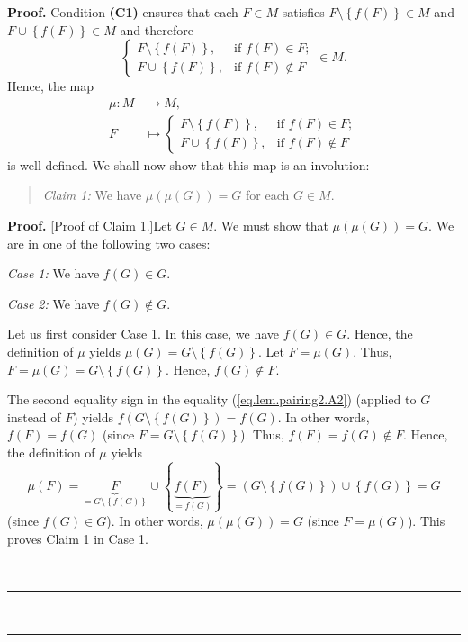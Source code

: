 \documentclass[numbers=enddot,12pt,final,onecolumn,notitlepage]{scrartcl}%
\theoremstyle{definition}
\newenvironment{statement}{\begin{quote}}{\end{quote}}
\newenvironment{proof}[1][Proof]{\noindent\textbf{#1.} }{\ \rule{0.5em}{0.5em}}
\newenvironment{vershort}{}{}
\begin{document}
\begin{proof}
Condition \textbf{(C1)} ensures that each $F\in M$ satisfies $F\setminus
\left\{  f\left(  F\right)  \right\}  \in M$ and $F\cup\left\{  f\left(
F\right)  \right\}  \in M$ and therefore
\[%
\begin{cases}
F\setminus\left\{  f\left(  F\right)  \right\}  , & \text{if }f\left(
F\right)  \in F;\\
F\cup\left\{  f\left(  F\right)  \right\}  , & \text{if }f\left(  F\right)
\notin F
\end{cases}
\in M.
\]
Hence, the map
\begin{align*}
\mu:M  &  \rightarrow M,\\
F  &  \mapsto%
\begin{cases}
F\setminus\left\{  f\left(  F\right)  \right\}  , & \text{if }f\left(
F\right)  \in F;\\
F\cup\left\{  f\left(  F\right)  \right\}  , & \text{if }f\left(  F\right)
\notin F
\end{cases}
\end{align*}
is well-defined. We shall now show that this map is an involution:

\begin{statement}
\textit{Claim 1:} We have $\mu\left(  \mu\left(  G\right)  \right)  =G$ for
each $G\in M$.
\end{statement}

\begin{proof}
[Proof of Claim 1.]Let $G\in M$. We must show that $\mu\left(  \mu\left(
G\right)  \right)  =G$. We are in one of the following two cases:

\textit{Case 1:} We have $f\left(  G\right)  \in G$.

\textit{Case 2:} We have $f\left(  G\right)  \notin G$.

Let us first consider Case 1. In this case, we have $f\left(  G\right)  \in
G$. Hence, the definition of $\mu$ yields $\mu\left(  G\right)  =G\setminus
\left\{  f\left(  G\right)  \right\}  $. Let $F=\mu\left(  G\right)  $. Thus,
$F=\mu\left(  G\right)  =G\setminus\left\{  f\left(  G\right)  \right\}  $.
Hence, $f\left(  G\right)  \notin F$.

\begin{vershort}
The second equality sign in the equality (\ref{eq.lem.pairing2.A2}) (applied
to $G$ instead of $F$) yields $f\left(  G\setminus\left\{  f\left(  G\right)
\right\}  \right)  =f\left(  G\right)  $. In other words, $f\left(  F\right)
=f\left(  G\right)  $ (since $F=G\setminus\left\{  f\left(  G\right)
\right\}  $). Thus, $f\left(  F\right)  =f\left(  G\right)  \notin F$. Hence,
the definition of $\mu$ yields
\[
\mu\left(  F\right)  =\underbrace{F}_{=G\setminus\left\{  f\left(  G\right)
\right\}  }\cup\left\{  \underbrace{f\left(  F\right)  }_{=f\left(  G\right)
}\right\}  =\left(  G\setminus\left\{  f\left(  G\right)  \right\}  \right)
\cup\left\{  f\left(  G\right)  \right\}  =G
\]
(since $f\left(  G\right)  \in G$). In other words, $\mu\left(  \mu\left(
G\right)  \right)  =G$ (since $F=\mu\left(  G\right)  $). This proves Claim 1
in Case 1.
\end{vershort}


\end{proof}
\end{proof}
\end{document}

